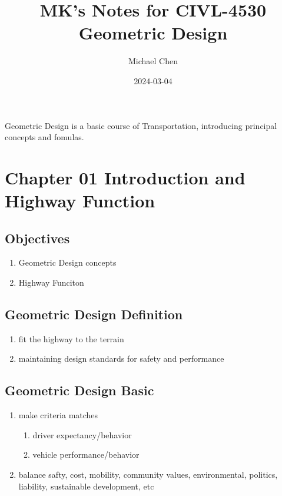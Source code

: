 \documentclass{article}
\title{MK's Notes for CIVL-4530 Geometric Design}
\date{2024-03-04}
\author{Michael Chen}
\begin{document}
  \maketitle
  \newpage


  \tableofcontents
  \newpage


  Geometric Design is a basic course of Transportation, introducing principal concepts and fomulas.

  \newpage

  \setcounter{section}{0}
  \section{Chapter 01 Introduction and Highway Function}
  \subsection{Objectives}
  \begin{enumerate}
    \item Geometric Design concepts
    \item Highway Funciton
  \end{enumerate}

  \subsection{Geometric Design Definition}
  \begin{enumerate}
    \item fit the highway to the terrain
    \item maintaining design standards for safety and performance
  \end{enumerate}

  \subsection{Geometric Design Basic}
  \begin{enumerate}
    \item make criteria matches  
    \begin{enumerate}
      \item driver expectancy/behavior
      \item vehicle performance/behavior
    \end{enumerate}
    \item balance safty, cost, mobility, community values, environmental, politics, liability, sustainable development, etc
  \end{enumerate}
\end{document}
